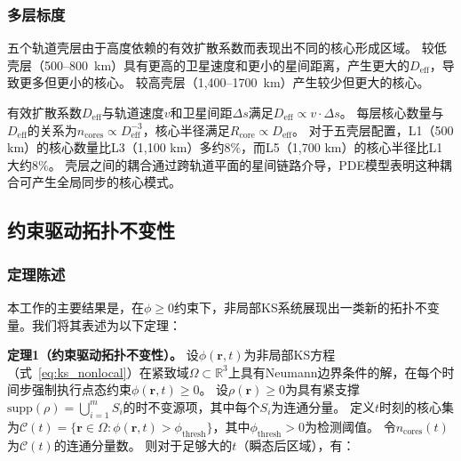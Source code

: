 \documentclass[sn-nature,pdflatex]{sn-jnl}
\begin{document}
\subsubsection{多层标度}

五个轨道壳层由于高度依赖的有效扩散系数而表现出不同的核心形成区域。
较低壳层（500--\SI{800}{\km}）具有更高的卫星速度和更小的星间距离，产生更大的$D_{\text{eff}}$，导致更多但更小的核心。
较高壳层（1,400--\SI{1700}{\km}）产生较少但更大的核心。

有效扩散系数$D_{\text{eff}}$与轨道速度$v$和卫星间距$\Delta s$满足$D_{\text{eff}} \propto v \cdot \Delta s$。
每层核心数量与$D_{\text{eff}}$的关系为$n_{\text{cores}} \propto D_{\text{eff}}^{-3}$，核心半径满足$R_{\text{core}} \propto D_{\text{eff}}$。
对于五壳层配置，L1（500 km）的核心数量比L3（1,100 km）多约$8\%$，而L5（1,700 km）的核心半径比L1大约$8\%$。
壳层之间的耦合通过跨轨道平面的星间链路介导，PDE模型表明这种耦合可产生全局同步的核心模式。

\subsection{约束驱动拓扑不变性}
\label{sec:topological_invariance}

\subsubsection{定理陈述}

本工作的主要结果是，在$\phi \ge 0$约束下，非局部KS系统展现出一类新的拓扑不变量。我们将其表述为以下定理：

\medskip
\noindent\textbf{定理1（约束驱动拓扑不变性）。}
设$\phi(\mathbf{r}, t)$为非局部KS方程（式~\ref{eq:ks_nonlocal}）在紧致域$\Omega \subset \mathbb{R}^3$上具有Neumann边界条件的解，在每个时间步强制执行点态约束$\phi(\mathbf{r}, t) \ge 0$。
设$\rho(\mathbf{r}) \ge 0$为具有紧支撑$\text{supp}(\rho) = \bigcup_{i=1}^{m} S_i$的时不变源项，其中每个$S_i$为连通分量。
定义$t$时刻的核心集为$\mathcal{C}(t) = \{\mathbf{r} \in \Omega : \phi(\mathbf{r}, t) > \phi_{\text{thresh}}\}$，其中$\phi_{\text{thresh}} > 0$为检测阈值。
令$n_{\text{cores}}(t)$为$\mathcal{C}(t)$的连通分量数。
则对于足够大的$t$（瞬态后区域），有：
\end{document}

